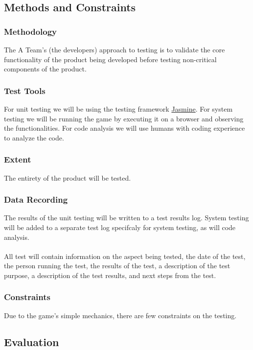 \documentclass[11pt, oneside]{article}   	%
\begin{document}
\subsection{Methods and Constraints}
\subsubsection*{Methodology}
The A Team's (the developers) approach to testing is to validate the core functionality of the product being developed before testing non-critical components of the product.

\subsubsection*{Test Tools}
For unit testing we will be using the testing framework \href{http://jasmine.github.io/}{Jasmine}. For system testing we will be running the game by executing it on a browser and observing the functionalities. For code analysis we will use humans with coding experience to analyze the code.

\subsubsection*{Extent}
The entirety of the product will be tested.

\subsubsection*{Data Recording}
The results of the unit testing will be written to a test results log. System testing will be added to a separate test log specifcaly for system testing, as will code analysis.\\
\\
All test will contain information on the aspect being tested, the date of the test, the person running the test, the results of the test, a description of the test purpose, a description of the test results, and next steps from the test.

\subsubsection*{Constraints}
Due to the game's simple mechanics, there are few constraints on the testing.

\subsection{Evaluation}
\end{document}
